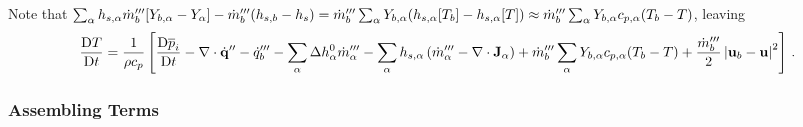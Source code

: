 \documentclass[11pt]{book}
\begin{document}
Note that $\sum_\alpha h_{s,\alpha} \dot{m}_{b}^{{\prime\prime\prime}}[Y_{b,\alpha} - Y_\alpha] - \dot{m}_{b}^{{\prime\prime\prime}} ( h_{s,b} - h_s ) = \dot{m}_{b}^{{\prime\prime\prime}} \sum_\alpha Y_{b,\alpha} (h_{s,\alpha}[T_b] - h_{s,\alpha}[T]) \approx \dot{m}_{b}^{{\prime\prime\prime}} \sum_\alpha Y_{b,\alpha} c_{p,\alpha}(T_b-T)$, leaving
\begin{equation}
\label{eqn_DTDt}
\frac{\mbox{D} T}{\mbox{D} t} = \frac{1}{\rho c_p} \left[\frac{\mbox{D} \overline{p}_i }{\mbox{D} t}
- \Div\dot{\mathbf{q}}^{\prime\prime} - \dq_b''' - \sum_\alpha \Delta h^0_\alpha \dot{m}_\alpha^{\tripleprime} - \sum_\alpha h_{s,\alpha}\left(  \dot{m}_\alpha^{\tripleprime} - \Div \mathbf{J}_{\alpha} \right) + \dot{m}_{b}^{\tripleprime} \sum_\alpha Y_{b,\alpha} c_{p,\alpha}(T_b-T) + \frac{\dot{m}_{b}^{\tripleprime}}{2}\left|\mathbf{u}_b-\mathbf{u}\right|^2 \right] \,\mbox{.} \nonumber \vspace{0.3cm} \\
\end{equation}

\subsubsection{Assembling Terms}
\label{putting_it_all_together}
\end{document}

